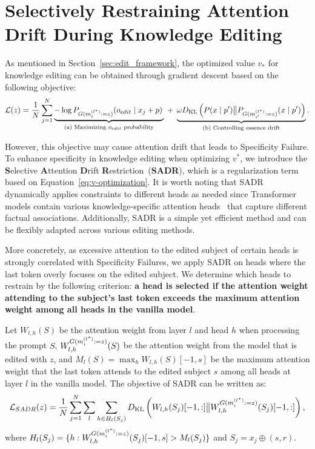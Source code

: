 \section{Selectively Restraining Attention Drift During Knowledge Editing} 
\label{sec:method}
As mentioned in Section~\ref{sec:edit_framework}, the optimized value \(v_*\) for knowledge editing can be obtained through gradient descent based on the following objective: 
\begin{align}\label{eq:v-optimization}
\mathcal{L}(z) = \frac{1}{N} \sum_{j=1}^N \underbrace{-\log P_{G(m^{(l^*)}_{i}:=z)}(o_{edit} \mid x_j+ p) \,}_\text{(a) Maximizing $o_{edit}$ probability} \; + \;  \underbrace{\omega D_{\mathrm{KL}}\left(P(x \mid p^\prime) \big\Vert P_{G(m^{(l^*)}_{i^\prime}:=z)}(x \mid p^\prime)\right)}_\text{(b) Controlling essence drift}.
\end{align}

However, this objective may cause attention drift that leads to Specificity Failure. 
To enhance specificity in knowledge editing when optimizing $v^*$, we introduce the \textbf{S}elective \textbf{A}ttention \textbf{D}rift \textbf{R}estriction~(\textbf{SADR}), which is a regularization term based on Equation~\ref{eq:v-optimization}.
It is worth noting that SADR dynamically applies constraints to different heads as needed since Transformer models contain various knowledge-specific attention heads~\citep{gpt2wild, geva2023dissecting} that capture different factual associations.
Additionally, SADR is a simple yet efficient method and can be flexibly adapted across various editing methods. 

More concretely, as excessive attention to the edited subject of certain heads is strongly correlated with Specificity Failures, we apply SADR on heads where the last token overly focuses on the edited subject. We determine which heads to restrain by the following criterion: \textbf{a head is selected if the attention weight attending to the subject's last token exceeds the maximum attention weight among all heads in the vanilla model}.

Let \( W_{l,h}(S) \) be the attention weight from layer \( l \) and head \( h \) when processing the prompt \( S \), \(W^{G(m^{(l^*)}_{i}:=z)}_{l,h}(S)\) be the attention weight from the model that is edited with \(z\), and \( M_{l}(S) = \max_h W_{l,h}(S)[-1,s] \) be the maximum attention weight that the last token attends to the edited subject $s$ among all heads at layer \(l\) in the vanilla model. The objective of SADR can be written as:
\begin{equation}
\label{eq:w-restrain}
\begin{aligned}
\mathcal{L}_{SADR}(z) &= \frac{1}{N} \sum_{j=1}^N \sum_l \sum_{h \in H_{l}(S_j)} D_{\mathrm{KL}}\left(W_{l,h}(S_j)[-1,:]\big\Vert W^{G(m^{(l^*)}_{i}:=z)}_{l,h}(S_j)[-1,:]\right), \\
\end{aligned}
\end{equation}
where $H_{l}(S_j) = \{ h : W^{G(m^{(l^*)}_{i}:=z)}_{l,h}(S_j)[-1,s] > M_{l}(S_j) \}$ and $S_j = x_j \oplus (s, r)$.

